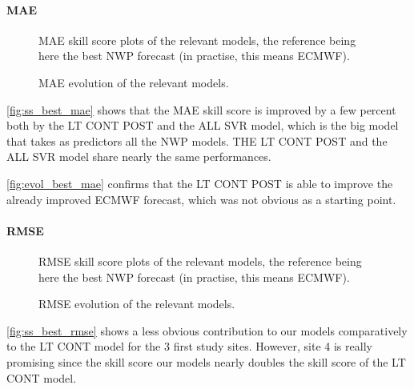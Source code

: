 \paragraph{MAE}
\indent
\begin{figure}[htb!]
    \centering
    
\caption{MAE skill score plots of the relevant models, the reference being here the best NWP forecast (in practise, this means ECMWF).}
\label{fig:ss_best_mae}
\end{figure}

\begin{figure}[htb!]
    \centering
    
\caption{MAE evolution of the relevant models.}
\label{fig:evol_best_mae}
\end{figure}
\newpage
\autoref{fig:ss_best_mae} shows that the MAE skill score is improved by a few percent both by the LT CONT POST and the ALL SVR model, which is the big model that takes as predictors all the NWP models. THE LT CONT POST and the ALL SVR model share nearly the same performances.

\autoref{fig:evol_best_mae} confirms that the LT CONT POST is able to improve the already improved ECMWF forecast, which was not obvious as a starting point.

\paragraph{RMSE}
\indent
\begin{figure}[htb!]
    \centering
    
\caption{RMSE skill score plots of the relevant models, the reference being here the best NWP forecast (in practise, this means ECMWF).}
\label{fig:ss_best_rmse}
\end{figure}
\newpage
\begin{figure}[htb!]
    \centering
    
\caption{RMSE evolution of the relevant models.}
\label{fig:evol_best_rmse}
\end{figure}

\autoref{fig:ss_best_rmse} shows a less obvious contribution to our models comparatively to the LT CONT model for the 3 first study sites.
However, site 4 is really promising since the skill score our models nearly doubles the  skill score of the LT CONT model. \\

